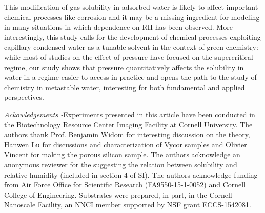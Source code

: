 \documentclass[aps,prl,twocolumn,superscriptaddress,groupedaddress]{revtex4}
\begin{document}
This modification of gas solubility in adsorbed water is likely to affect important chemical processes like corrosion and it may be a missing ingredient for modeling in many situations in which dependence on $\mathrm{RH}$ has been observed. More interestingly, this study calls for the development of chemical processes exploiting capillary condensed water as a tunable solvent in the context of green chemistry: while most of studies on the effect of pressure have focused on the supercritical regime, our study shows that pressure quantitatively affects the solubility in water in a regime easier to access in practice and opens the path to the study of chemistry in metastable water, interesting for both fundamental and applied perspectives. 

\textit{Ackowledgements -}Experiments presented in this article have been conducted in the Biotechnology Resource Center Imaging Facility at Cornell University. The authors thank Prof. Benjamin Widom for interesting discussion on the theory, Hanwen Lu for discussions and characterization of Vycor samples and Olivier Vincent for making the porous silicon sample. The authors acknowledge an anonymous reviewer for the suggesting the relation between solubility and relative humidity (included in section 4 of SI). The authors acknowledge funding from Air Force Office for Scientific Research (FA9550-15-1-0052) and Cornell College of Engineering. Substrates were prepared, in part, in the Cornell Nanoscale Facility, an NNCI member supported by NSF grant ECCS-1542081.


%
\end{document}
